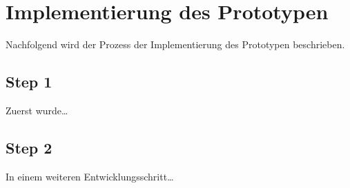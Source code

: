 \section{Implementierung des Prototypen}

Nachfolgend wird der Prozess der Implementierung des Prototypen beschrieben.

\subsection{Step 1}
Zuerst wurde\dots{}

\subsection{Step 2}
In einem weiteren Entwicklungsschritt\dots{}
\pagebreak